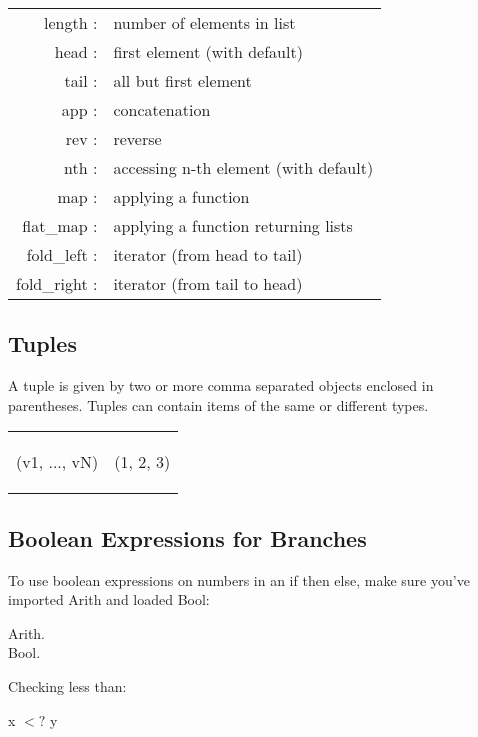 \begin{tabular}{r L}
length :	
	& number of elements in list 				 \\
head : 
	& first element (with default) 				\\
tail : 
	& all but first element						\\
app : 
	& concatenation						\\
rev : 
	& reverse								\\
nth : 
	& accessing n-th element (with default)		\\
map : 
	& applying a function						\\
flat\_map : 
	& applying a function returning lists			\\
fold\_left : 
	& iterator (from head to tail)				\\
fold\_right : 
	&iterator (from tail to head)
\end{tabular}



\subsection{Tuples} \label{tuple} 

A tuple is given by two or more comma separated objects enclosed in parentheses. Tuples can contain items of the same or different types.

\hspace{-1cm}
\begin{tabular}{p{8cm} p{8cm}}
\begin{code}
	(v1, ..., vN)
\end{code}
&
\begin{code}
	(1, 2, 3)
\end{code}
\end{tabular}



\subsection{Boolean Expressions for Branches} \label{bool_expr} 
To use boolean expressions on numbers in an if then else, make sure you've imported Arith and loaded Bool:
\begin{code}
	 Arith.	\\
	\Load Bool.
\end{code}

Checking less than:
\begin{code}
	x $<?$ y 
\end{code}

